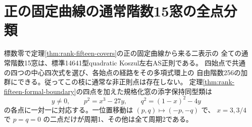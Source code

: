 \section{正の固定曲線の通常階数15窓の全点分類}
\label{sec:rank-fifteen-all-ordinary}
\begin{theorem}\label{thm:rank-fifteen-all-ordinary}
標数零で定理\ref{thm:rank-fifteen-covers}の正の固定曲線から来る二表示の
全ての通常階数15窓は、標準14641型quadratic Koszul左右AS正則である。
四始点で共通の四つの中心四次式を選び、各始点の経路をその多項式環上の
自由階数256の加群にできる。従ってこの枝に通常な非正則点は存在しない。
定理\ref{thm:rank-fifteen-formal-boundary}の四点を加えた規格化窓の添字保持同型類は
\[
        y\ne0,\qquad p^2=x^3-27y,\qquad q^2=(1-x)^2-4y
\]
の各点に一対一に対応する。一位置移動は $(p,q)\mapsto(-p,-q)$ で、
$x=3,3/4$ で $p=q=0$ の二点だけが周期1、その他は全て周期2である。
\end{theorem}
